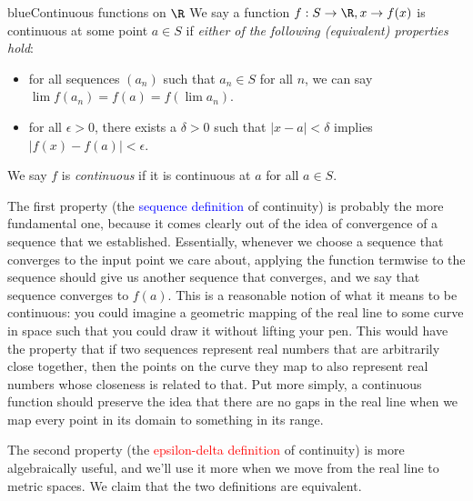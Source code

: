 \documentclass[./analysis.tex]{subfiles}
\begin{document}
    \begin{mycolorbox}{blue}{Continuous functions on $\R$} We say a function $f: S \to \R, x \to f(x)$ is continuous at some point $a \in S$ if \emph{either of the following (equivalent) properties hold}: 
    
    \begin{itemize}
        \item for all sequences $(a_n)$ such that $a_n \in S$ for all $n$, we can say $\lim f(a_n) = f(a) = f(\lim a_n)$.
        \item for all $\epsilon > 0$, there exists a $\delta > 0$ such that $|x - a| < \delta$ implies $|f(x) - f(a)| < \epsilon$. 
    \end{itemize}

    We say $f$ is \emph{continuous} if it is continuous at $a$ for all $a \in S$.
    \end{mycolorbox}

    The first property (the \textcolor{blue}{sequence definition} of continuity) is probably the more fundamental one, because it comes clearly out of the idea of convergence of a sequence that we established. Essentially, whenever we choose a sequence that converges to the input point we care about, applying the function termwise to the sequence should give us another sequence that converges, and we say that sequence converges to $f(a)$. This is a reasonable notion of what it means to be continuous: you could imagine a geometric mapping of the real line to some curve in space such that you could draw it without lifting your pen. This would have the property that if two sequences represent real numbers that are arbitrarily close together, then the points on the curve they map to also represent real numbers whose closeness is related to that. Put more simply, a continuous function should preserve the idea that there are no gaps in the real line when we map every point in its domain to something in its range.

    The second property (the \textcolor{red}{epsilon-delta definition} of continuity) is more algebraically useful, and we'll use it more when we move from the real line to metric spaces. We claim that the two definitions are equivalent.
\end{document}
